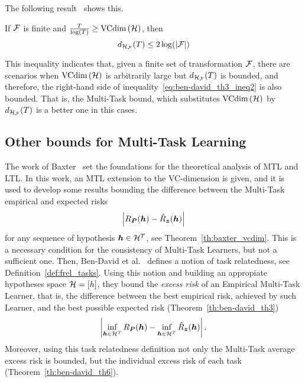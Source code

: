 The following result~\cite[Theorem~6]{Ben-DavidB08} shows this.
\begin{theorem}\label{th:ben-david_th6}
    If $\mathcal{F}$ is finite and $\frac{T}{\log (T)} \geq \text{VCdim}\left(\mathcal{H}\right)$, then
    \begin{equation}
        \nonumber
        d_{\mathcal{H}_{\mathcal{F}}}(T) \leq 2 \log(\left|\mathcal{F}\right|)
    \end{equation}
\end{theorem}
This inequality indicates that, given a finite set of transformation $\mathcal{F}$, there are scenarios when $\text{VCdim}\left(\mathcal{H}\right)$ is arbitrarily large but $d_{\mathcal{H}_{\mathcal{F}}}(T)$ is bounded, and therefore, the right-hand side of inequality~\eqref{eq:ben-david_th3_ineq2} is also bounded. That is, the Multi-Task bound, which substitutes $\text{VCdim}\left(\mathcal{H}\right)$ by $d_{\mathcal{H}_{\mathcal{F}}}(T)$ is a better one in this cases. 



\subsection{Other bounds for Multi-Task Learning}
The work of Baxter~\cite{baxter2000model} set the foundations for the theoretical analysis of MTL and LTL. 
In this work, an MTL extension to the VC-dimension is given, and it is used to develop some results bounding the difference between the Multi-Task empirical and expected risks 
\begin{equation}
    \nonumber
    \left|R_{\bm{P}}(\bm{h}) - \hat{R}_{\bm{z}}(\bm{h})\right|
\end{equation}
for any sequence of hypothesis $\bm{h} \in \mathcal{H}^T$, see Theorem~\ref{th:baxter_vcdim}. This is a necessary condition for the consistency of Multi-Task Learners, but not a sufficient one.
Then, Ben-David et al.~\cite{Ben-DavidS03,Ben-DavidB08} defines a notion of task relatedness, see Definition~\ref{def:frel_tasks}. Using this notion and building an appropiate hypotheses space $\mathcal{H} = \lbrack h\rbrack$, they bound the \emph{excess risk} of an Empirical Multi-Task Learner, that is, the difference between the best empirical risk, achieved by such Learner, and the best possible expected risk (Theorem~\ref{th:ben-david_th3})
\begin{equation}
    \nonumber
    \left|\inf_{\bm{h} \in \mathcal{H}^T} R_{\bm{P}}(\bm{h}) - \inf_{\bm{h} \in \mathcal{H}^T} \hat{R}_{\bm{z}}(\bm{h})\right| .
\end{equation}
Moreover, using this task relatedness definition not only the Multi-Task average excess risk is bounded, but the individual excess risk of each task (Theorem~\ref{th:ben-david_th6}).

